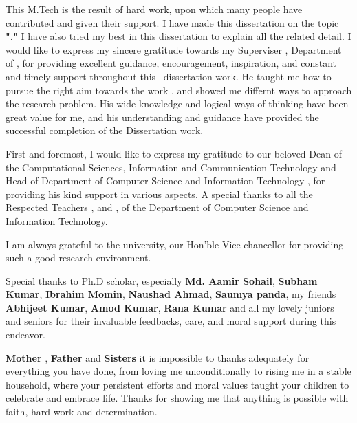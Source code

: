 
\begin{acknowledgements}
\addchaptertocentry{\acknowledgementname} %
\vspace*{2cm}
This M.Tech \rType is the result of hard work, upon which many people have contributed and given their support. I
have made this dissertation on the topic \textbf{"\ReportTitel ."} I have also tried my best in this dissertation to
explain all the related detail. I would like to express my sincere gratitude towards my Superviser \textbf{
	\Supervisor}, Department of \depS, for providing excellent guidance, encouragement, inspiration, and constant and
timely support throughout this \DegreeS \  dissertation work. He taught me how to pursue the right aim towards the work
, and showed me differnt ways to approach the research problem. His wide knowledge and logical ways of thinking have
been great value for me, and his understanding and guidance have provided the successful completion of the
Dissertation work.

First and foremost, I would like to express my gratitude to our beloved Dean of the Computational Sciences,
Information and Communication Technology and Head of Department of Computer Science and Information Technology \textbf{\HodName},
for providing his kind support in various aspects. A special thanks to all the Respected Teachers
\textbf{\Facone}, and \textbf{\Factwo}, of the Department of Computer Science and Information
Technology.

I am always grateful to the university, our Hon’ble Vice chancellor \textbf{\Vc} for providing
such a good research environment.

	Special thanks to Ph.D scholar, especially \textbf{Md. Aamir Sohail}, \textbf{Subham Kumar}, \textbf{Ibrahim Momin},
\textbf{Naushad Ahmad}, \textbf{Saumya panda},  my friends  \textbf{Abhijeet Kumar},
\textbf{Amod Kumar}, \textbf{Rana Kumar}
and all my lovely juniors and seniors  for their invaluable feedbacks, care, and moral support during this endeavor.

	\textbf{Mother} , \textbf{Father} and \textbf{Sisters} it is impossible to thanks adequately for everything you have done, from
loving me unconditionally to rising me in a stable household, where your persistent efforts and moral values
taught your children to celebrate and embrace life. Thanks for showing me that anything is possible with faith, hard work and determination. 



\end{acknowledgements}
